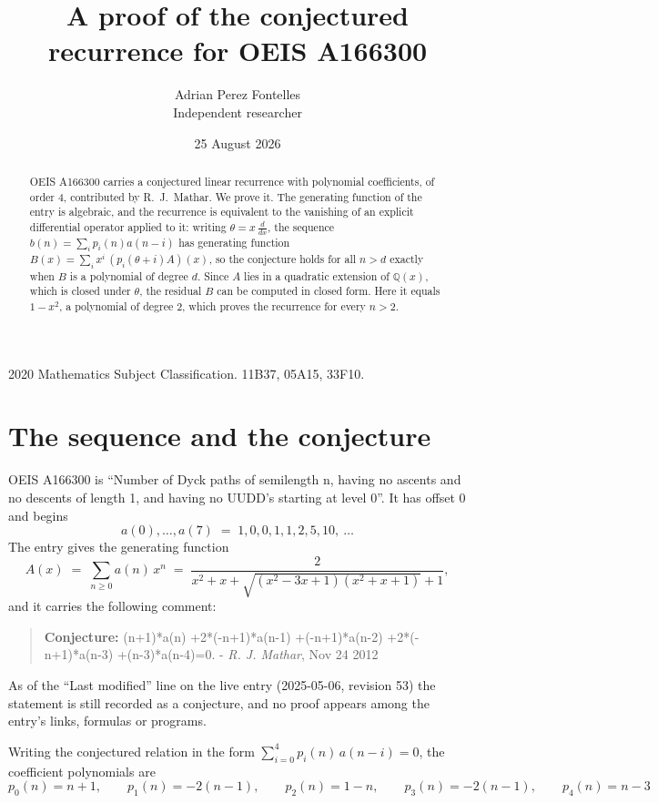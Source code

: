 \documentclass[11pt,a4paper]{article}
\title{A proof of the conjectured recurrence for OEIS A166300}
\author{Adrian Perez Fontelles\\ \small Independent researcher}
\date{25 August 2026}
\theoremstyle{plain}
\theoremstyle{definition}
\begin{document}
\maketitle

\begin{abstract}
OEIS A166300 carries a conjectured linear recurrence with polynomial coefficients, of
order 4, contributed by R.~J.~Mathar. We prove it. The generating function of the
entry is algebraic, and the recurrence is equivalent to the vanishing of an explicit
differential operator applied to it: writing $\theta=x\,\frac{d}{dx}$, the sequence
$b(n)=\sum_{i}p_{i}(n)a(n-i)$ has generating function
$B(x)=\sum_{i}x^{i}\,(p_{i}(\theta+i)A)(x)$, so the conjecture holds for all $n>d$ exactly
when $B$ is a polynomial of degree $d$. Since $A$ lies in a quadratic extension of
$\mathbb{Q}(x)$, which is closed under $\theta$, the residual $B$ can be computed in
closed form. Here it equals $1 - x^{2}$, a polynomial of degree $2$, which proves
the recurrence for every $n>2$.
\end{abstract}

\noindent\small 2020 Mathematics Subject Classification. 11B37, 05A15, 33F10.\normalsize

\section{The sequence and the conjecture}

OEIS A166300 is ``Number of Dyck paths of semilength n, having no ascents and no descents of length 1, and having no UUDD's starting at level 0''. It has offset $0$ and begins
\[
a(0),\dots,a(7)\;=\;1, 0, 0, 1, 1, 2, 5, 10,\ \dots
\]
The entry gives the generating function
\begin{equation}\label{eq:gf}
A(x)\;=\;\sum_{n\ge 0} a(n)\,x^{n}\;=\;\frac{2}{x^{2} + x + \sqrt{\left(x^{2} - 3 x + 1\right) \left(x^{2} + x + 1\right)} + 1} ,
\end{equation}
and it carries the following comment:
\begin{quote}\small
\textbf{Conjecture:} (n+1)*a(n) +2*(-n+1)*a(n-1) +(-n+1)*a(n-2) +2*(-n+1)*a(n-3) +(n-3)*a(n-4)=0. - \emph{R. J. Mathar}, Nov 24 2012
\end{quote}
As of the ``Last modified'' line on the live entry (2025-05-06, revision 53) the
statement is still recorded as a conjecture, and no proof appears among the entry's links,
formulas or programs.

Writing the conjectured relation in the form $\sum_{i=0}^{4}p_{i}(n)\,a(n-i)=0$,
the coefficient polynomials are
\[
p_{0}(n)=n + 1,\qquad p_{1}(n)=- 2 \left(n - 1\right),\qquad p_{2}(n)=1 - n,\qquad p_{3}(n)=- 2 \left(n - 1\right),\qquad p_{4}(n)=n - 3
\]
\end{document}
